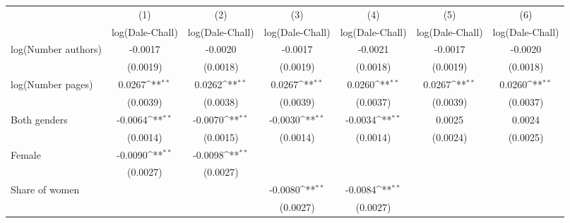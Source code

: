 {
\def\sym#1{\ifmmode^{#1}\else\(^{#1}\)\fi}
\begin{tabular}{l*{6}{c}}
\hline\hline
                    &\multicolumn{1}{c}{(1)}&\multicolumn{1}{c}{(2)}&\multicolumn{1}{c}{(3)}&\multicolumn{1}{c}{(4)}&\multicolumn{1}{c}{(5)}&\multicolumn{1}{c}{(6)}\\
                    &\multicolumn{1}{c}{log(Dale-Chall)}&\multicolumn{1}{c}{log(Dale-Chall)}&\multicolumn{1}{c}{log(Dale-Chall)}&\multicolumn{1}{c}{log(Dale-Chall)}&\multicolumn{1}{c}{log(Dale-Chall)}&\multicolumn{1}{c}{log(Dale-Chall)}\\
\hline
\hspace{3mm}log(Number authors)&     -0.0017        &     -0.0020        &     -0.0017        &     -0.0021        &     -0.0017        &     -0.0020        \\
                    &    (0.0019)        &    (0.0018)        &    (0.0019)        &    (0.0018)        &    (0.0019)        &    (0.0018)        \\
[1em]
\hspace{3mm}log(Number pages)&      0.0267\sym{**}&      0.0262\sym{**}&      0.0267\sym{**}&      0.0260\sym{**}&      0.0267\sym{**}&      0.0260\sym{**}\\
                    &    (0.0039)        &    (0.0038)        &    (0.0039)        &    (0.0037)        &    (0.0039)        &    (0.0037)        \\
[1em]
\hspace{3mm}Both genders&     -0.0064\sym{**}&     -0.0070\sym{**}&     -0.0030\sym{**}&     -0.0034\sym{**}&      0.0025        &      0.0024        \\
                    &    (0.0014)        &    (0.0015)        &    (0.0014)        &    (0.0014)        &    (0.0024)        &    (0.0025)        \\
[1em]
\hspace{3mm}Female  &     -0.0090\sym{**}&     -0.0098\sym{**}&                    &                    &                    &                    \\
                    &    (0.0027)        &    (0.0027)        &                    &                    &                    &                    \\
[1em]
\hspace{3mm}Share of women&                    &                    &     -0.0080\sym{**}&     -0.0084\sym{**}&                    &                    \\
                    &                    &                    &    (0.0027)        &    (0.0027)        &                    &                    \\

\end{tabular}}
